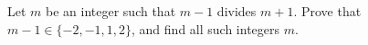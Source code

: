 Let $m$ be an integer such that $m-1$ divides $m+1$. Prove that $m-1\in\{-2,-1,1,2\}$, and find all such integers $m$.
